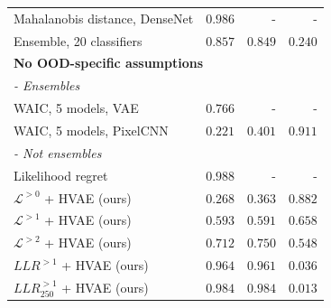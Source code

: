 \begin{frame}
\begin{table}
{\begin{tabular}{lrrr}
    Mahalanobis distance, DenseNet {\parencite{lee_simple_2018}}                & $0.986$ & - & - \\
    Ensemble, 20 classifiers {\parencite{ren_likelihood_2019, lakshminarayanan_simple_2017}}                  & $0.857$ & $0.849$ & $0.240$ \\
             \multicolumn{4}{l}{\textbf{No OOD-specific assumptions}} \\
             \multicolumn{4}{l}{\textit{- Ensembles}} \\
    WAIC, 5 models, VAE {\parencite{choi_waic_2019}}                          & $0.766$ & - & - \\
    WAIC, 5 models, PixelCNN {\parencite{ren_likelihood_2019}}                      & $0.221$ & $0.401$ & $0.911$ \\
            \multicolumn{4}{l}{\textit{- Not ensembles}} \\
    Likelihood regret \parencite{xiao_likelihood_2020}                               & $\mathbf{0.988}$ & - & - \\
    $\mathcal{L}^{>0}$ + HVAE (ours)                    & $0.268$ & $0.363$ & $0.882$ \\
    $\mathcal{L}^{>1}$ + HVAE (ours)                    & $0.593$ & $0.591$ & $0.658$ \\
    $\mathcal{L}^{>2}$ + HVAE (ours)                    & $0.712$ & $0.750$ & $0.548$ \\
    $LLR^{>1}$ + HVAE (ours)                            & $0.964$ & $0.961$ & $0.036$ \\
    $LLR^{>1}_{250}$ + HVAE (ours)                      & $0.984$ & $\mathbf{0.984}$ & $\mathbf{0.013}$ \\
             \bottomrule
        \end{tabular}%
        }
    \end{table}
\end{frame}


